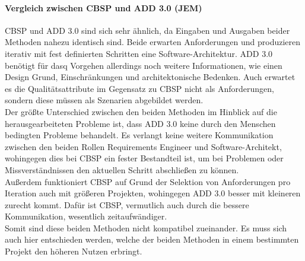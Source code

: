 \paragraph{Vergleich zwischen CBSP und ADD 3.0 (JEM)}
CBSP und ADD 3.0 sind sich sehr \"ahnlich, da Eingaben und Ausgaben beider Methoden nahezu identisch sind. Beide erwarten Anforderungen und produzieren iterativ mit fest definierten Schritten eine Software-Architektur. ADD 3.0 ben\"otigt f\"ur dasq Vorgehen allerdings noch weitere Informationen, wie einen Design Grund, Einschr\"ankungen und architektonische Bedenken. Auch erwartet es die Qualit\"atsattribute im Gegensatz zu CBSP nicht als Anforderungen, sondern diese m\"ussen als Szenarien abgebildet werden. \\

Der gr\"o\ss{}te Unterschied zwischen den beiden Methoden im Hinblick auf die herausgearbeiteten Probleme ist, dass ADD 3.0 keine durch den Menschen bedingten Probleme behandelt. Es verlangt keine weitere Kommunikation zwischen den beiden Rollen Requirements Engineer und Software-Architekt, wohingegen dies bei CBSP ein fester Bestandteil ist, um bei Problemen oder Missverst\"andnissen den aktuellen Schritt abschlie\ss{}en zu k\"onnen. \\

Au\ss{}erdem funktioniert CBSP auf Grund der Selektion von Anforderungen pro Iteration auch mit gr\"o\ss{}eren Projekten, wohingegen ADD 3.0 besser mit kleineren zurecht kommt. Daf\"ur ist CBSP, vermutlich auch durch die bessere Kommunikation, wesentlich zeitaufw\"andiger. \\

Somit sind diese beiden Methoden nicht kompatibel zueinander. Es muss sich auch hier entschieden werden, welche der beiden Methoden in einem bestimmten Projekt den h\"oheren Nutzen erbringt. \\
